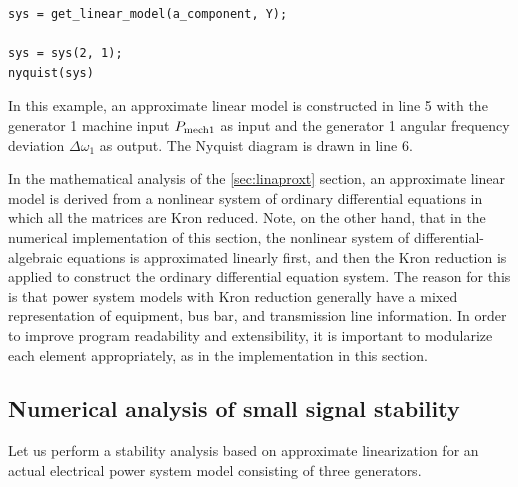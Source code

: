 \documentclass[tombow,dvipdfmx]{corona-a5-1.1}
\begin{document}
\begin{例}
\begin{PROGRAMA}[count,title={load\_impedance.m}]
\begin{verbatim}
sys = get_linear_model(a_component, Y);

sys = sys(2, 1);
nyquist(sys)
\end{verbatim}
\end{PROGRAMA}

In this example, an approximate linear model is constructed in line 5 with the generator 1 machine input $P_{{\rm mech}1}$ as input and the generator 1 angular frequency deviation $\Delta\omega_1$ as output.
The Nyquist diagram is drawn in line 6.
\end{例}

In the mathematical analysis of the \ref{sec:linaproxt} section, an approximate linear model is derived from a nonlinear system of ordinary differential equations in which all the matrices are Kron reduced. 
Note, on the other hand, that in the numerical implementation of this section, the nonlinear system of differential-algebraic equations is approximated linearly first, and then the Kron reduction is applied to construct the ordinary differential equation system.
The reason for this is that power system models with Kron reduction generally have a mixed representation of equipment, bus bar, and transmission line information.
In order to improve program readability and extensibility, it is important to modularize each element appropriately, as in the implementation in this section.

\subsection{Numerical analysis of small signal stability}

Let us perform a stability analysis based on approximate linearization for an actual electrical power system model consisting of three generators.

%
\end{document}
